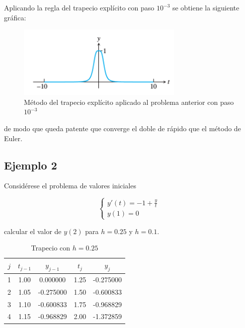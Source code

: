 \documentclass{article}
\theoremstyle{theorem-style}  %
\theoremstyle{definition-style}
\theoremstyle{example-style}
\begin{document}
		Aplicando la regla del trapecio explícito con paso $10^{-3}$ se obtiene la siguiente gráfica:

		\begin{figure}[H]
			\centering
			\includegraphics[width=8cm]{./Images/ej1-2.png}
			\caption{Método del trapecio explícito aplicado al problema anterior con paso $10^{-3}$}
			\label{fig:ej1-2}
		\end{figure}

		de modo que queda patente que converge el doble de rápido que el método de Euler.

\subsection{Ejemplo 2} \label{ejemplo2}

Considérese el problema de valores iniciales

		\begin{equation*}
			\begin{cases}
			y'(t) = -1 + \frac{y}{t} \\
			y(1) = 0
			\end{cases}
		\end{equation*}

calcular el valor de $y(2)$ para $h=0.25$ y $h=0.1$.

	\begin{table}[H]
		\centering
		\begin{tabular}{|| c | c | c | c | c ||}
			\hline
			\hline $j$ &  $t_{j-1}$ & $y_{j-1}$ & $t_j$ & $y_j$ \\
			\hline 1 & 1.00 & 0.000000 & 1.25 & -0.275000 \\
			\hline 2 & 1.05 & -0.275000 & 1.50 & -0.600833 \\
			\hline 3 & 1.10 & -0.600833 & 1.75 & -0.968829 \\
			\hline 4 & 1.15 & -0.968829 & 2.00 & -1.372859 \\
		\end{tabular}
		\caption{Trapecio con $h=0.25$}
		\label{table:trapecio-ejemplo2.1}
	\end{table}
\end{document}
